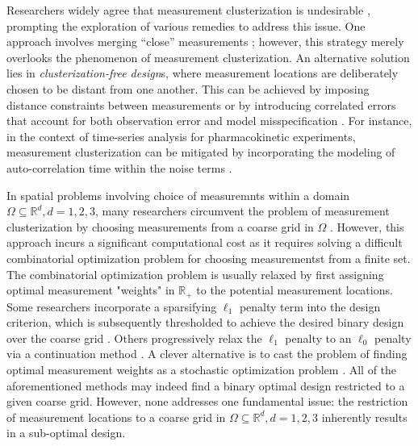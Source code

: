 Researchers widely agree that measurement clusterization is
undesirable \cite{fedorov1996, hooker2009, fedorov2012, Ucinski05,
  neitzel2019sparse}, prompting the exploration of various remedies to
address this issue. One approach involves merging ``close''
measurements \cite{fedorov2012}; however, this strategy merely
overlooks the phenomenon of measurement clusterization. An alternative
solution lies in \emph{clusterization-free design}s, where measurement
locations are deliberately chosen to be distant from one another. This
can be achieved by imposing distance constraints between measurements
or by introducing correlated errors that account for both observation
error and model misspecification \cite{Ucinski05}. For instance, in
the context of time-series analysis for pharmacokinetic experiments,
measurement clusterization can be mitigated by incorporating the
modeling of auto-correlation time within the noise terms
\cite{hooker2009}.


In spatial problems involving choice of measuremnts within a domain
$\Omega \subseteq \mathbb{R}^d, d=1,2,3$, many researchers circumvent
the problem of measurement clusterization by choosing measurements
from a coarse grid in $\Omega$ \cite{koval2020, alexanderian2021,
  attia2020, alexanderian2014, alexanderian2016,
  alexanderian2018efficient}. However, this approach incurs a
significant computational cost as it requires solving a difficult
combinatorial optimization problem for choosing measurementst from a
finite set. The combinatorial optimization problem is usually relaxed
by first assigning optimal measurement "weights" in $\mathbb{R}_+$ to
the potential measurement locations. Some researchers incorporate a
sparsifying $\ell_1$ penalty term into the design criterion, which is
subsequently thresholded to achieve the desired binary design over the
coarse grid \cite{horesh2008borehole}. Others progressively relax the
$\ell_1$ penalty to an $\ell_0$ penalty via a continuation method
\cite{alexanderian2016, alexanderian2014}. A clever alternative is to
cast the problem of finding optimal measurement weights as a
stochastic optimization problem \cite{attia2022stochastic}. All of the
aforementioned methods may indeed find a binary optimal design
restricted to a given coarse grid. However, none addresses one
fundamental issue: the restriction of measurement locations to a
coarse grid in $\Omega \subseteq \mathbb{R}^d, d=1,2,3$ inherently
results in a sub-optimal design.

